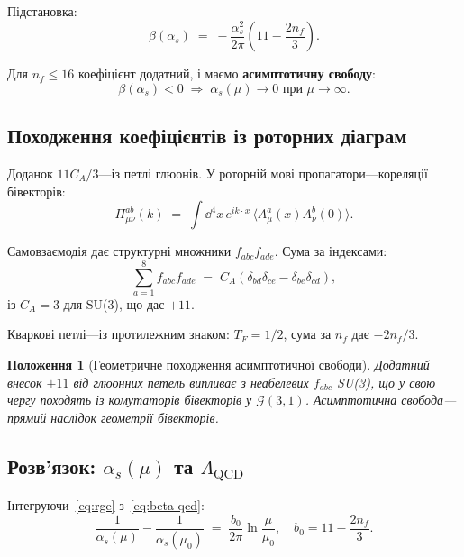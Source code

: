 \documentclass[11pt,a4paper]{article}
\newcommand{\Cl}{\mathcal{G}}
\theoremstyle{definition}
\theoremstyle{plain}
\newtheorem{proposition}{Положення}[section]
\theoremstyle{remark}
\begin{document}
Підстановка:
\begin{equation}
\beta(\alpha_s) \;=\; -\frac{\alpha_s^2}{2\pi}\left(11 - \frac{2n_f}{3}\right).
\label{eq:beta-qcd}
\end{equation}

Для $n_f\le 16$ коефіцієнт додатний, і маємо \textbf{асимптотичну свободу}:
\begin{equation}
\beta(\alpha_s)<0 \;\Rightarrow\; \alpha_s(\mu)\to 0 \text{ при } \mu\to\infty.
\end{equation}

\subsection{Походження коефіцієнтів із роторних діаграм}

Доданок $11C_A/3$—із петлі глюонів. У роторній мові пропагатори—кореляції бівекторів:
\begin{equation}
\Pi_{\mu\nu}^{ab}(k) \;=\; \int \dd^4x \, e^{ik \cdot x}\,\langle A_\mu^a(x) A_\nu^b(0) \rangle.
\end{equation}

Самовзаємодія дає структурні множники $f_{abc}f_{ade}$. Сума за індексами:
\begin{equation}
\sum_{a=1}^8 f_{abc}f_{ade} \;=\; C_A(\delta_{bd}\delta_{ce} - \delta_{be}\delta_{cd}),
\end{equation}
із $C_A=3$ для SU(3), що дає $+11$.

Кваркові петлі—із протилежним знаком: $T_F=1/2$, сума за $n_f$ дає $-2n_f/3$.

\begin{proposition}[Геометричне походження асимптотичної свободи]
Додатний внесок $+11$ від глюонних петель випливає з неабелевих $f_{abc}$ SU(3), що у свою чергу походять із комутаторів бівекторів у $\Cl(3,1)$. Асимптотична свобода—прямий наслідок геометрії бівекторів.
\end{proposition}

\subsection{Розв’язок: $\alpha_s(\mu)$ та $\Lambda_{\mathrm{QCD}}$}

Інтегруючи~\eqref{eq:rge} з~\eqref{eq:beta-qcd}:
\begin{equation}
\frac{1}{\alpha_s(\mu)} - \frac{1}{\alpha_s(\mu_0)} \;=\; \frac{b_0}{2\pi}\ln\frac{\mu}{\mu_0},\quad b_0=11-\frac{2n_f}{3}.
\end{equation}
\end{document}
